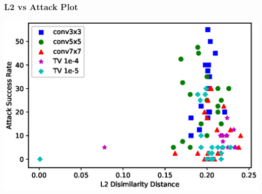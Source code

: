\documentclass{beamer}
\begin{document}
\begin{frame}
\frametitle{L2 vs Attack Plot}
\begin{center}
	\includegraphics[scale=0.6]{L2vsAttkplot.eps}
\end{center}
\end{frame}
\end{document}
